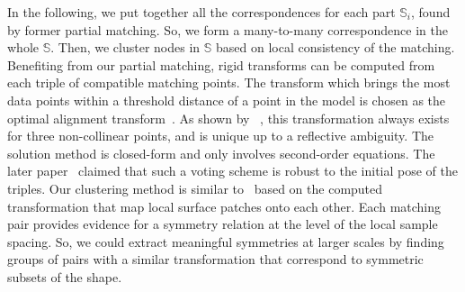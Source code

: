 In the following, we put together all the correspondences for each part $\mathbb{S}_i$, found by former partial matching.
So, we form a many-to-many correspondence in the whole $\mathbb{S}$.  
Then, we cluster nodes in $\mathbb{S}$ based on local consistency of the matching.
Benefiting from our partial matching, rigid transforms can be computed from each triple of compatible matching points.
The transform which brings the most data points within a threshold distance of a point in the model is chosen as the optimal alignment transform~\cite{Huttenlocher1990}.
As shown by ~\cite{Huttenlocher1990}, this transformation always exists for three non-collinear points, and is unique up to a reflective ambiguity. 
The solution method is closed-form and only involves second-order equations.
The later paper~\cite{Gelfand05} claimed that such a voting scheme is robust to the initial pose of the triples.
Our clustering method is similar to~\cite{mitra2006} based on the computed transformation that map local surface patches onto each other.
Each matching pair provides evidence for a symmetry relation at the level of the local sample spacing. 
So, we could extract meaningful symmetries at larger scales by finding groups of pairs with a similar transformation 
that correspond to symmetric subsets of the shape.



